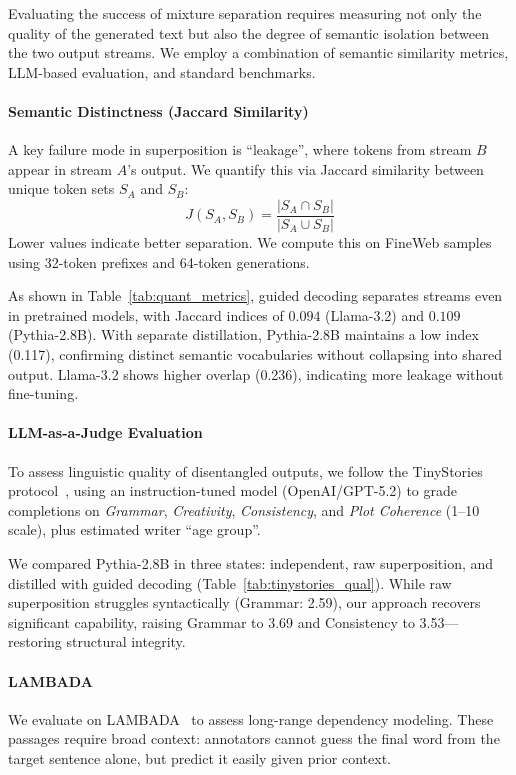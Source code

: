 \documentclass{article}
\theoremstyle{plain}
\theoremstyle{definition}
\theoremstyle{remark}
\begin{document}
Evaluating the success of mixture separation requires measuring not only the quality of the generated text but also the degree of semantic isolation between the two output streams. We employ a combination of semantic similarity metrics, LLM-based evaluation, and standard benchmarks.

\paragraph{Semantic Distinctness (Jaccard Similarity)}
A key failure mode in superposition is ``leakage'', where tokens from stream $B$ appear in stream $A$'s output. We quantify this via Jaccard similarity between unique token sets $S_A$ and $S_B$:
\begin{equation}
    J(S_A, S_B) = \frac{|S_A \cap S_B|}{|S_A \cup S_B|}
\end{equation}
Lower values indicate better separation. We compute this on FineWeb samples using 32-token prefixes and 64-token generations.

As shown in Table~\ref{tab:quant_metrics}, guided decoding separates streams even in pretrained models, with Jaccard indices of $0.094$ (Llama-3.2) and $0.109$ (Pythia-2.8B). With separate distillation, Pythia-2.8B maintains a low index (0.117), confirming distinct semantic vocabularies without collapsing into shared output. Llama-3.2 shows higher overlap (0.236), indicating more leakage without fine-tuning.

\paragraph{LLM-as-a-Judge Evaluation}
To assess linguistic quality of disentangled outputs, we follow the TinyStories protocol~\cite{eldan2023tinystories}, using an instruction-tuned model (OpenAI/GPT-5.2) to grade completions on \textit{Grammar}, \textit{Creativity}, \textit{Consistency}, and \textit{Plot Coherence} (1--10 scale), plus estimated writer ``age group''.

We compared Pythia-2.8B in three states: independent, raw superposition, and distilled with guided decoding (Table~\ref{tab:tinystories_qual}). While raw superposition struggles syntactically (Grammar: 2.59), our approach recovers significant capability, raising Grammar to 3.69 and Consistency to 3.53—restoring structural integrity.

\paragraph{LAMBADA}
We evaluate on LAMBADA~\cite{paperno2016lambada} to assess long-range dependency modeling. These passages require broad context: annotators cannot guess the final word from the target sentence alone, but predict it easily given prior context.
\end{document}
